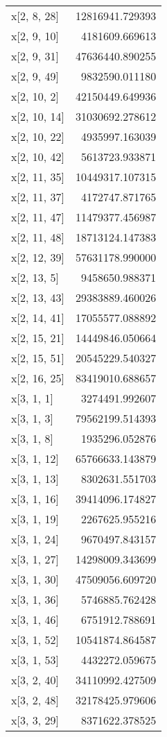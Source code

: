 \begin{longtable}{lr}
x[2, 8, 28] & 12816941.729393 \\
x[2, 9, 10] & 4181609.669613 \\
x[2, 9, 31] & 47636440.890255 \\
x[2, 9, 49] & 9832590.011180 \\
x[2, 10, 2] & 42150449.649936 \\
x[2, 10, 14] & 31030692.278612 \\
x[2, 10, 22] & 4935997.163039 \\
x[2, 10, 42] & 5613723.933871 \\
x[2, 11, 35] & 10449317.107315 \\
x[2, 11, 37] & 4172747.871765 \\
x[2, 11, 47] & 11479377.456987 \\
x[2, 11, 48] & 18713124.147383 \\
x[2, 12, 39] & 57631178.990000 \\
x[2, 13, 5] & 9458650.988371 \\
x[2, 13, 43] & 29383889.460026 \\
x[2, 14, 41] & 17055577.088892 \\
x[2, 15, 21] & 14449846.050664 \\
x[2, 15, 51] & 20545229.540327 \\
x[2, 16, 25] & 83419010.688657 \\
x[3, 1, 1] & 3274491.992607 \\
x[3, 1, 3] & 79562199.514393 \\
x[3, 1, 8] & 1935296.052876 \\
x[3, 1, 12] & 65766633.143879 \\
x[3, 1, 13] & 8302631.551703 \\
x[3, 1, 16] & 39414096.174827 \\
x[3, 1, 19] & 2267625.955216 \\
x[3, 1, 24] & 9670497.843157 \\
x[3, 1, 27] & 14298009.343699 \\
x[3, 1, 30] & 47509056.609720 \\
x[3, 1, 36] & 5746885.762428 \\
x[3, 1, 46] & 6751912.788691 \\
x[3, 1, 52] & 10541874.864587 \\
x[3, 1, 53] & 4432272.059675 \\
x[3, 2, 40] & 34110992.427509 \\
x[3, 2, 48] & 32178425.979606 \\
x[3, 3, 29] & 8371622.378525 \\

\end{longtable}
